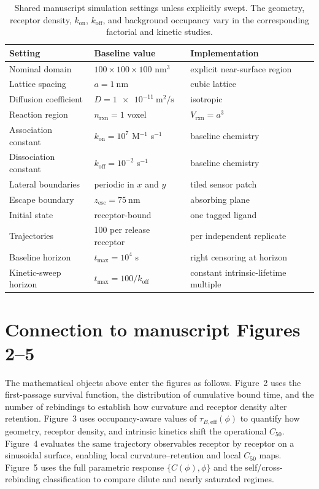 \documentclass[11pt]{article}
\newcommand{\kOn}{k_{\mathrm{on}}}
\newcommand{\kOff}{k_{\mathrm{off}}}
\newcommand{\tauB}{\tau_{B,\mathrm{eff}}}
\begin{document}
\begin{table}[ht]
\centering
\caption{Shared manuscript simulation settings unless explicitly swept.  The
geometry, receptor density, $\kOn$, $\kOff$, and background occupancy vary in
the corresponding factorial and kinetic studies.}
\label{tab:baseline-settings}
\begin{tabular}{@{}lll@{}}
\toprule
Setting & Baseline value & Implementation \\
\midrule
Nominal domain & $100\times100\times100$ nm$^3$ & explicit near-surface region \\
Lattice spacing & $a=\SI{1}{\nano\meter}$ & cubic lattice \\
Diffusion coefficient & $D=\SI{1e-11}{\meter\squared\per\second}$ & isotropic \\
Reaction region & $n_{\mathrm{rxn}}=1$ voxel & $V_{\mathrm{rxn}}=a^3$ \\
Association constant & $\kOn=10^7$ M$^{-1}$ s$^{-1}$ & baseline chemistry \\
Dissociation constant & $\kOff=10^{-2}$ s$^{-1}$ & baseline chemistry \\
Lateral boundaries & periodic in $x$ and $y$ & tiled sensor patch \\
Escape boundary & $z_{\mathrm{esc}}=\SI{75}{\nano\meter}$ & absorbing plane \\
Initial state & receptor-bound & one tagged ligand \\
Trajectories & 100 per release receptor & per independent replicate \\
Baseline horizon & $t_{\max}=10^4$ s & right censoring at horizon \\
Kinetic-sweep horizon & $t_{\max}=100/\kOff$ & constant intrinsic-lifetime multiple \\
\bottomrule
\end{tabular}
\end{table}






\section{Connection to manuscript Figures 2--5}

The mathematical objects above enter the figures as follows.  Figure~2 uses
the first-passage survival function, the distribution of cumulative bound
time, and the number of rebindings to establish how curvature and receptor
density alter retention.  Figure~3 uses occupancy-aware values of
$\tauB(\phi)$ to quantify how geometry, receptor density, and intrinsic
kinetics shift the operational $C_{50}$.  Figure~4 evaluates the same
trajectory observables receptor by receptor on a sinusoidal surface, enabling
local curvature--retention and local $C_{50}$ maps.  Figure~5 uses the full
parametric response $\{C(\phi),\phi\}$ and the self/cross-rebinding
classification to compare dilute and nearly saturated regimes.
\end{document}
